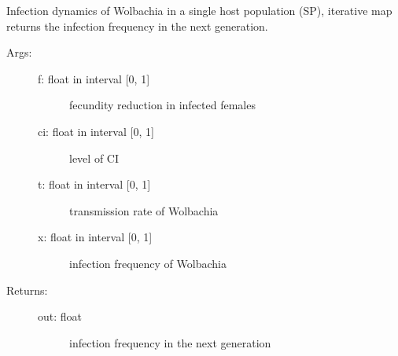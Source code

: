\documentclass[letterpaper,10pt,english]{sphinxmanual}
\begin{document}
\begin{fulllineitems}
\label{index:wspec.analytical.dynamics_SP}
Infection dynamics of Wolbachia in a single host population (SP), 
iterative map returns the infection frequency in the next
generation.
\begin{description}
\item[{Args:}] \leavevmode\begin{description}
\item[{f: float in interval {[}0, 1{]}}] \leavevmode
fecundity reduction in infected females

\item[{ci: float in interval {[}0, 1{]}}] \leavevmode
level of CI

\item[{t: float in interval {[}0, 1{]}}] \leavevmode
transmission rate of Wolbachia

\item[{x: float in interval {[}0, 1{]}}] \leavevmode
infection frequency of Wolbachia

\end{description}

\item[{Returns:}] \leavevmode\begin{description}
\item[{out: float}] \leavevmode
infection frequency in the next generation

\end{description}

\end{description}

\end{fulllineitems}

\end{document}
